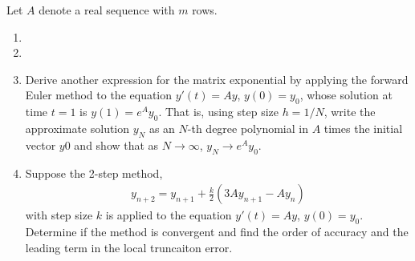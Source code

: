 \documentclass[10pt]{article}
\begin{document}
\begin{problem}
Let \( A \) denote a real sequence with \( m \) rows.
    \begin{enumerate}[nolistsep,label=(\alph*)]
    \item
    \item 
    \item Derive another expression for the matrix exponential by applying the forward Euler method to the equation \( y'(t) = Ay\), \(y(0) = y_0 \), whose solution at time \( t = 1 \) is \( y(1) = e^Ay_0\). That is, using step size \( h = 1/N\), write the approximate solution \( y_N \) as an \(N\)-th degree polynomial in \( A \) times the initial vector \( y0 \) and show that as \( N \to \infty \), \( y_N \to e^Ay_0 \).
    \item Suppose the 2-step method,
        \begin{align*}
            y_{n+2} = y_{n+1} + \frac{k}{2}(3Ay_{n+1}-Ay_n)
        \end{align*}
            with step size \( k \) is applied to the equation \( y'(t) = A y \), \( y(0) = y_0 \). Determine if the method is convergent and find the order of accuracy and the leading term in the local truncaiton error.
\end{enumerate}
\end{problem}
\end{document}
